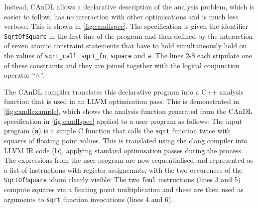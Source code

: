     Instead, CAnDL allows a declarative description of the analysis problem,
    which is easier to follow, has no interaction with other optimisations and
    is much less verbose.
    This is shown in \autoref{fig:candlspec}.
    The specification is given the identifier \texttt{SqrtOfSquare} in the
    first line of the program and then defined by the interaction of seven
    atomic constraint statements that have to hold simultaneously hold on the
    values of \texttt{sqrt\_call}, \texttt{sqrt\_fn}, \texttt{square} and
    \texttt{a}.
    The lines 2-8 each stipulate one of these constraints and they are joined
    together with the logical conjunction operator ``$\land$''.

    The CAnDL compiler translates this declarative program into a C++ analysis
    function that is used in an LLVM optimisation pass.
    This is demonstrated in \autoref{fig:candlexample}, which shows the analysis
    function generated from the CAnDL specification in \autoref{fig:candlspec}
    applied to a user program as follows:
    The input program ({\bf a}) is a simple C function that calls the
    \texttt{sqrt} function twice with squares of floating point values.
    This is translated using the clang compiler into LLVM IR code ({\bf b}),
    applying standard optimisation passes during the process.
    The expressions from the user program are now sequentialised and represented
    as a list of instructions with register assignemnts, with the two occurences
    of the \texttt{SqrtOfSquare} idiom clearly visible:
    The two \texttt{fmul} instructions (lines 3 and 5) compute squares via a
    floating point multiplication and these are then used as arguments to
    \texttt{sqrt} function invocations (lines 4 and 6).

